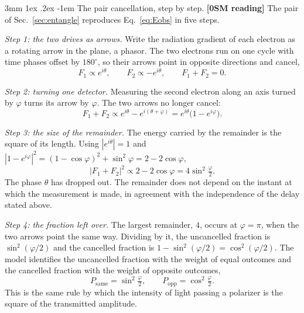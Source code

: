 \documentclass[%
 reprint, amsmath,amssymb, aps, prb, ]{revtex4-2}
\makeatletter
\numberwithin{equation}{section}
\renewcommand\paragraph{%
  \@startsection{paragraph}{4}{\z@}%
    {3mm \@plus 1ex \@minus .2ex}
    {-1em}
    {\normalfont\normalsize\itshape}}
\makeatother
\begin{document}
\paragraph{The pair cancellation, step by step.} \textbf{[0SM reading]} The pair of Sec.~\ref{sec:entangle} reproduces Eq.~\eqref{eq:Eobs} in five steps.

\emph{Step 1: the two drives as arrows.} Write the radiation gradient of each electron as a rotating arrow in the plane, a phasor. The two electrons run on one cycle with time phases offset by $180^\circ$, so their arrows point in opposite directions and cancel,
\begin{equation}
F_1\propto e^{i\theta},\qquad F_2\propto-e^{i\theta},\qquad F_1+F_2=0 .
\end{equation}

\emph{Step 2: turning one detector.} Measuring the second electron along an axis turned by $\varphi$ turns its arrow by $\varphi$. The two arrows no longer cancel:
\begin{equation}
F_1+F_2\propto e^{i\theta}-e^{i(\theta+\varphi)}=e^{i\theta}\big(1-e^{i\varphi}\big).
\end{equation}

\emph{Step 3: the size of the remainder.} The energy carried by the remainder is the square of its length. Using $|e^{i\theta}|=1$ and $|1-e^{i\varphi}|^2=(1-\cos\varphi)^2+\sin^2\varphi=2-2\cos\varphi$,
\begin{equation}
\big|F_1+F_2\big|^2\propto 2-2\cos\varphi=4\sin^2\!\tfrac{\varphi}{2}.
\label{eq:residual}
\end{equation}
The phase $\theta$ has dropped out. The remainder does not depend on the instant at which the measurement is made, in agreement with the independence of the delay stated above.

\emph{Step 4: the fraction left over.} The largest remainder, $4$, occurs at $\varphi=\pi$, when the two arrows point the same way. Dividing by it, the uncancelled fraction is $\sin^2(\varphi/2)$ and the cancelled fraction is $1-\sin^2(\varphi/2)=\cos^2(\varphi/2)$. The model identifies the uncancelled fraction with the weight of equal outcomes and the cancelled fraction with the weight of opposite outcomes,
\begin{equation}
P_{\mathrm{same}}=\sin^2\!\tfrac{\varphi}{2},\qquad P_{\mathrm{opp}}=\cos^2\!\tfrac{\varphi}{2}.
\label{eq:Psame}
\end{equation}
This is the same rule by which the intensity of light passing a polarizer is the square of the transmitted amplitude.
\end{document}
